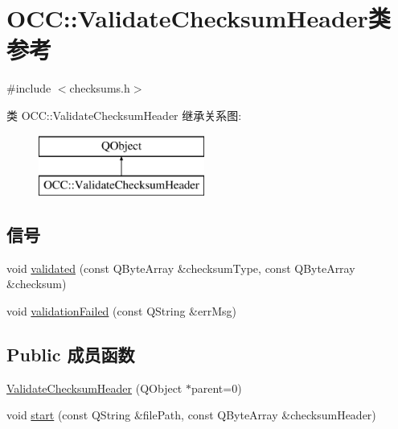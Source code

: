 \hypertarget{class_o_c_c_1_1_validate_checksum_header}{}\section{O\+CC\+:\+:Validate\+Checksum\+Header类 参考}
\label{class_o_c_c_1_1_validate_checksum_header}


{\ttfamily \#include $<$checksums.\+h$>$}

类 O\+CC\+:\+:Validate\+Checksum\+Header 继承关系图\+:\begin{figure}[H]
\begin{center}
\leavevmode
\includegraphics[height=2.000000cm]{class_o_c_c_1_1_validate_checksum_header}
\end{center}
\end{figure}
\subsection*{信号}
\begin{DoxyCompactItemize}
\item 
void \hyperlink{class_o_c_c_1_1_validate_checksum_header_a94b124915bc14e309142b7ebb15a292d}{validated} (const Q\+Byte\+Array \&checksum\+Type, const Q\+Byte\+Array \&checksum)
\item 
void \hyperlink{class_o_c_c_1_1_validate_checksum_header_a5de3509bf48fabd8f5c2ee130b13b7d7}{validation\+Failed} (const Q\+String \&err\+Msg)
\end{DoxyCompactItemize}
\subsection*{Public 成员函数}
\begin{DoxyCompactItemize}
\item 
\hyperlink{class_o_c_c_1_1_validate_checksum_header_abd3865ec71e5d30d56f48bde20e337e2}{Validate\+Checksum\+Header} (Q\+Object $\ast$parent=0)
\item 
void \hyperlink{class_o_c_c_1_1_validate_checksum_header_a0100eb8ff9c87c770660d15e69a92ead}{start} (const Q\+String \&file\+Path, const Q\+Byte\+Array \&checksum\+Header)
\end{DoxyCompactItemize}


